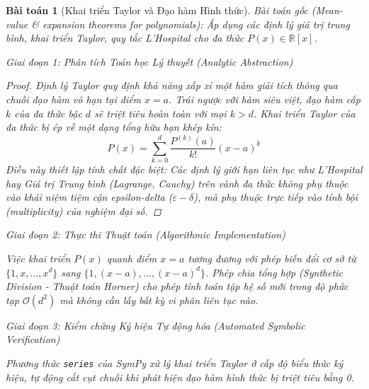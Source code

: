 \documentclass{article}
\newtheorem{baitoan}{Bài toán}
\begin{document}
\begin{baitoan}[Khai triển Taylor và Đạo hàm Hình thức]
 \emph{Bài toán gốc (Mean-value \& expansion theorems for polynomials):} 
 Áp dụng các định lý giá trị trung bình, khai triển Taylor, quy tắc L'Hospital cho đa thức $P(x)\in\mathbb{R}[x]$.

\vspace{0.5em}\noindent\emph{Giai đoạn 1: Phân tích Toán học Lý thuyết (Analytic Abstraction)}
 
 \begin{proof}
 Định lý Taylor quy định khả năng xấp xỉ một hàm giải tích thông qua chuỗi đạo hàm vô hạn tại điểm $x=a$. Trái ngược với hàm siêu việt, đạo hàm cấp $k$ của đa thức bậc $d$ sẽ triệt tiêu hoàn toàn với mọi $k > d$. Khai triển Taylor của đa thức bị ép về một dạng tổng hữu hạn khép kín:
 \begin{equation}
 P(x) = \sum_{k=0}^d \frac{P^{(k)}(a)}{k!} (x-a)^k
 \end{equation}
 Điều này thiết lập tính chất đặc biệt: Các định lý giới hạn liên tục như L'Hospital hay Giá trị Trung bình (Lagrange, Cauchy) trên vành đa thức không phụ thuộc vào khái niệm tiệm cận epsilon-delta ($\varepsilon-\delta$), mà phụ thuộc trực tiếp vào tính bội (multiplicity) của nghiệm đại số. 
 \end{proof}

\vspace{0.5em}\noindent\emph{Giai đoạn 2: Thực thi Thuật toán (Algorithmic Implementation)}
 
 Việc khai triển $P(x)$ quanh điểm $x=a$ tương đương với phép biến đổi cơ sở từ $\{1, x, \dots, x^d\}$ sang $\{1, (x-a), \dots, (x-a)^d\}$. Phép chia tổng hợp (Synthetic Division - Thuật toán Horner) cho phép tính toán tập hệ số mới trong độ phức tạp $\mathcal{O}(d^2)$ mà không cần lấy bất kỳ vi phân liên tục nào.



\vspace{0.5em}\noindent\emph{Giai đoạn 3: Kiểm chứng Ký hiệu Tự động hóa (Automated Symbolic Verification)}
 
 Phương thức \texttt{series} của \textsf{SymPy} xử lý khai triển Taylor ở cấp độ biểu thức ký hiệu, tự động cắt cụt chuỗi khi phát hiện đạo hàm hình thức bị triệt tiêu bằng 0.




\end{baitoan}
\end{document}
